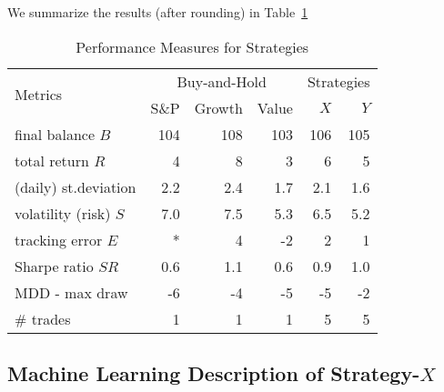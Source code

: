 \documentclass{article}
\begin{document}
We summarize the results (after rounding) in Table~\ref{tab_comparison_11_days}
\begin{table}[!h]
    \centering
    \caption{Performance Measures for Strategies}
    \vspace{0.1in}
    \begin{tabular}{ l | rrr | rr } \hline
     \multirow{2}{*}{Metrics} & \multicolumn{3}{c|}{Buy-and-Hold} &
  \multicolumn{2}{c}{Strategies} \\
  & S{\&}P & Growth & Value & $X$ & $Y$ \\ \hline
  final balance $B$ & 104 & 108 & 103 & 106 & 105 \\
   total return $R$  & 4  &   8    &   3   &   6   &   5\\ 
   (daily) st.deviation & 2.2 & 2.4 & 1.7 & 2.1 & 1.6 \\
   volatility (risk)  $S$  &  7.0   &   7.5   &  5.3   &   6.5   &   5.2\\ 
   tracking error $E$ & * & 4 & -2 & 2 & 1 \\
    Sharpe ratio $SR$ &  0.6   &   1.1    &   0.6   &   0.9   &   1.0\\ 
   MDD - max draw      &    -6   &   -4   &   -5   &   -5   &   -2\\ 
   {\#} trades  &    1  &  1    &   1   &   5   &   5\\ 
    \hline
      \hline
\end{tabular}
\label{tab_comparison_11_days}
\end{table}




\subsection{Machine Learning Description of Strategy-$X$} 
\end{document}
